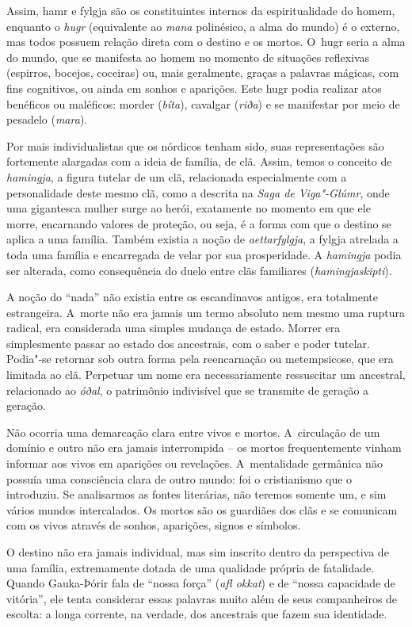 Assim, hamr e fylgja são os constituintes internos da espiritualidade do
homem, enquanto o \emph{hugr} (equivalente ao \emph{mana} polinésico, a
alma do mundo) é o externo, mas todos possuem relação direta com o
destino e os mortos. O~hugr seria a alma do mundo, que se manifesta ao
homem no momento de situações reflexivas (espirros, bocejos, coceiras)
ou, mais geralmente, graças a palavras mágicas, com fins cognitivos, ou
ainda em sonhos e aparições. Este hugr podia realizar atos benéficos ou
maléficos: morder (\emph{bíta}), cavalgar (\emph{riða}) e se manifestar
por meio de pesadelo (\emph{mara}).

Por mais individualistas que os nórdicos tenham sido, suas
representações são fortemente alargadas com a ideia de família, de clã.
Assim, temos o conceito de \emph{hamingja}, a figura tutelar de um clã,
relacionada especialmente com a personalidade deste mesmo clã, como a
descrita na \emph{Saga de Viga"-Glúmr}, onde uma gigantesca mulher surge
ao herói, exatamente no momento em que ele morre, encarnando valores de
proteção, ou seja, é a forma com que o destino se aplica a uma família.
Também existia a noção de \emph{aettarfylgja}, a fylgja atrelada a toda
uma família e encarregada de velar por sua prosperidade. A
\emph{hamingja} podia ser alterada, como consequência do duelo entre
clãs familiares (\emph{hamingjaskipti}).

A noção do ``nada'' não existia entre os escandinavos antigos, era
totalmente estrangeira. A~morte não era jamais um termo absoluto nem
mesmo uma ruptura radical, era considerada uma simples mudança de
estado. Morrer era simplesmente passar ao estado dos ancestrais, com o
saber e poder tutelar. Podia"-se retornar sob outra forma pela
reencarnação ou metempsicose, que era limitada ao clã. Perpetuar um nome
era necessariamente ressuscitar um ancestral, relacionado ao
\emph{óðal}, o patrimônio indivisível que se transmite de geração a
geração.

Não ocorria uma demarcação clara entre vivos e mortos. A~circulação de
um domínio e outro não era jamais interrompida -- os mortos
frequentemente vinham informar aos vivos em aparições ou revelações. 
A~mentalidade germânica não possuía uma consciência clara de outro mundo:
foi o cristianismo que o introduziu. Se analisarmos as fontes
literárias, não teremos somente um, e sim vários mundos intercalados. Os
mortos são os guardiães dos clãs e se comunicam com os vivos através de
sonhos, aparições, signos e símbolos.

O destino não era jamais individual, mas sim inscrito dentro da
perspectiva de uma família, extremamente dotada de uma qualidade própria
de fatalidade. Quando Gauka-Þórir fala de ``nossa força'' (\emph{afl
okkat}) e de ``nossa capacidade de vitória'', ele tenta considerar essas
palavras muito além de seus companheiros de escolta: a longa corrente,
na verdade, dos ancestrais que fazem sua identidade.

